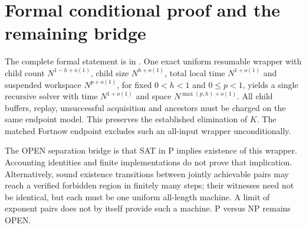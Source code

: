 \section{Formal conditional proof and the remaining bridge}
The complete formal statement is in
.
One exact uniform resumable wrapper with child count
$N^{1-h+o(1)}$, child size $N^{h+o(1)}$, total local time
$N^{1+o(1)}$ and suspended workspace $N^{p+o(1)}$, for fixed
$0<h<1$ and $0\le p<1$, yields a single recursive solver with time
$N^{1+o(1)}$ and space $N^{\max(p,h)+o(1)}$.
All child buffers, replay, unsuccessful acquisition and ancestors must
be charged on the same endpoint model. This preserves the established
elimination of $K$. The matched Fortnow endpoint excludes such an
all-input wrapper unconditionally.

The OPEN separation bridge is that SAT in P implies existence of this
wrapper. Accounting identities and finite implementations do not prove
that implication. Alternatively, sound existence transitions between
jointly achievable pairs may reach a verified forbidden region in
finitely many steps; their witnesses need not be identical, but each
must be one uniform all-length machine. A limit of exponent pairs does
not by itself provide such a machine. P versus NP remains OPEN.
